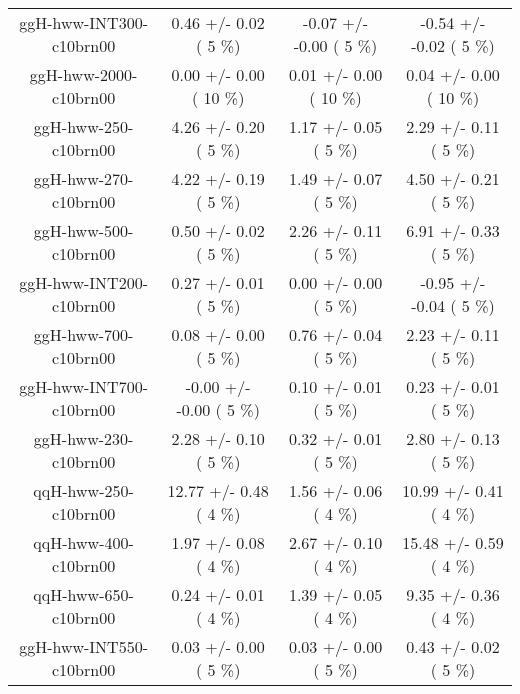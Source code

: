 \begin{table}[h!]
\begin{center}
{\begin{tabular}{
c| c | c | c | }
 ggH-hww-INT300-c10brn00   &       0.46 +/-       0.02 (         5 \%)   &      -0.07 +/-      -0.00 (         5 \%)   &      -0.54 +/-      -0.02 (         5 \%)  \\
 ggH-hww-2000-c10brn00   &       0.00 +/-       0.00 (        10 \%)   &       0.01 +/-       0.00 (        10 \%)   &       0.04 +/-       0.00 (        10 \%)  \\
 ggH-hww-250-c10brn00   &       4.26 +/-       0.20 (         5 \%)   &       1.17 +/-       0.05 (         5 \%)   &       2.29 +/-       0.11 (         5 \%)  \\
 ggH-hww-270-c10brn00   &       4.22 +/-       0.19 (         5 \%)   &       1.49 +/-       0.07 (         5 \%)   &       4.50 +/-       0.21 (         5 \%)  \\
 ggH-hww-500-c10brn00   &       0.50 +/-       0.02 (         5 \%)   &       2.26 +/-       0.11 (         5 \%)   &       6.91 +/-       0.33 (         5 \%)  \\
 ggH-hww-INT200-c10brn00   &       0.27 +/-       0.01 (         5 \%)   &       0.00 +/-       0.00 (         5 \%)   &      -0.95 +/-      -0.04 (         5 \%)  \\
 ggH-hww-700-c10brn00   &       0.08 +/-       0.00 (         5 \%)   &       0.76 +/-       0.04 (         5 \%)   &       2.23 +/-       0.11 (         5 \%)  \\
 ggH-hww-INT700-c10brn00   &      -0.00 +/-      -0.00 (         5 \%)   &       0.10 +/-       0.01 (         5 \%)   &       0.23 +/-       0.01 (         5 \%)  \\
 ggH-hww-230-c10brn00   &       2.28 +/-       0.10 (         5 \%)   &       0.32 +/-       0.01 (         5 \%)   &       2.80 +/-       0.13 (         5 \%)  \\
 qqH-hww-250-c10brn00   &      12.77 +/-       0.48 (         4 \%)   &       1.56 +/-       0.06 (         4 \%)   &      10.99 +/-       0.41 (         4 \%)  \\
 qqH-hww-400-c10brn00   &       1.97 +/-       0.08 (         4 \%)   &       2.67 +/-       0.10 (         4 \%)   &      15.48 +/-       0.59 (         4 \%)  \\
 qqH-hww-650-c10brn00   &       0.24 +/-       0.01 (         4 \%)   &       1.39 +/-       0.05 (         4 \%)   &       9.35 +/-       0.36 (         4 \%)  \\
 ggH-hww-INT550-c10brn00   &       0.03 +/-       0.00 (         5 \%)   &       0.03 +/-       0.00 (         5 \%)   &       0.43 +/-       0.02 (         5 \%)  \\

\end{tabular}}
\end{center}
\end{table}
